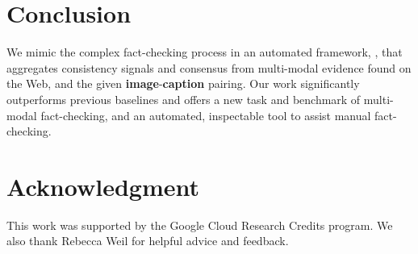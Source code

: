 \section{Conclusion}
We mimic the complex fact-checking process in an automated framework, \model{}, that aggregates consistency signals and consensus from multi-modal evidence found on the Web, and the given \textbf{\textcolor{myOrange}{image}}-\textbf{\textcolor{myblue}{caption}} pairing. Our work significantly outperforms previous baselines and offers a new task and benchmark of multi-modal fact-checking, and an automated, inspectable tool to assist manual fact-checking.

\section*{Acknowledgment}
This work was supported by the Google Cloud Research Credits program. We also thank Rebecca Weil for helpful advice and feedback.